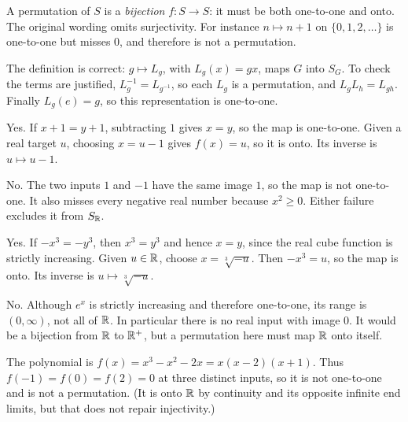 A permutation of $S$ is a \emph{bijection} $f:S\to S$: it must be both one-to-one and onto. The original wording omits surjectivity. For instance $n\mapsto n+1$ on $\{0,1,2,\ldots\}$ is one-to-one but misses $0$, and therefore is not a permutation.

The definition is correct: $g\mapsto L_g$, with $L_g(x)=gx$, maps $G$ into $S_G$. To check the terms are justified, $L_g^{-1}=L_{g^{-1}}$, so each $L_g$ is a permutation, and $L_gL_h=L_{gh}$. Finally $L_g(e)=g$, so this representation is one-to-one.

Yes. If $x+1=y+1$, subtracting $1$ gives $x=y$, so the map is one-to-one. Given a real target $u$, choosing $x=u-1$ gives $f(x)=u$, so it is onto. Its inverse is $u\mapsto u-1$.

No. The two inputs $1$ and $-1$ have the same image $1$, so the map is not one-to-one. It also misses every negative real number because $x^2\ge0$. Either failure excludes it from $S_{\mathbb{R}}$.

Yes. If $-x^3=-y^3$, then $x^3=y^3$ and hence $x=y$, since the real cube function is strictly increasing. Given $u\in\mathbb{R}$, choose $x=\sqrt[3]{-u}$. Then $-x^3=u$, so the map is onto. Its inverse is $u\mapsto\sqrt[3]{-u}$.

No. Although $e^x$ is strictly increasing and therefore one-to-one, its range is $(0,\infty)$, not all of $\mathbb{R}$. In particular there is no real input with image $0$. It would be a bijection from $\mathbb{R}$ to $\mathbb{R}^+$, but a permutation here must map $\mathbb{R}$ onto itself.

The polynomial is $f(x)=x^3-x^2-2x=x(x-2)(x+1)$. Thus $f(-1)=f(0)=f(2)=0$ at three distinct inputs, so it is not one-to-one and is not a permutation. (It is onto $\mathbb{R}$ by continuity and its opposite infinite end limits, but that does not repair injectivity.)

